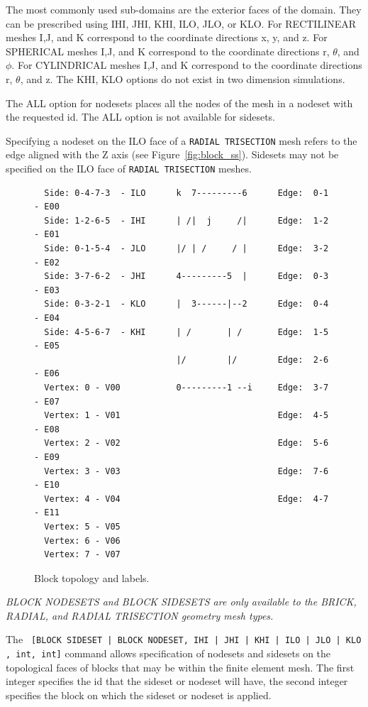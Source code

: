 The most commonly used sub-domains are the exterior faces of the
domain. They can be prescribed using \textsc {IHI, JHI, KHI, ILO,
JLO,} or \textsc {KLO}. For RECTILINEAR meshes \textsc {I,J,} and
\textsc {K} correspond to the coordinate directions x, y, and z. For
SPHERICAL meshes \textsc {I,J,} and \textsc {K} correspond to the
coordinate directions r, $\theta$, and $\phi$. For CYLINDRICAL meshes \textsc
{I,J,} and \textsc {K} correspond to the coordinate directions r,
$\theta$, and z.  The \textsc {KHI, KLO} options do not exist in two
dimension simulations.

The \textsc{ALL} option for nodesets places all the nodes of the mesh in a 
nodeset with the requested id. The \textsc{ALL} option is not available for 
sidesets.

Specifying a nodeset on the \textsc{ILO} face of a \texttt{RADIAL TRISECTION} mesh 
refers to the edge aligned with the Z axis (see Figure~\ref{fig:block_ss}). 
Sidesets may not be  specified on the \textsc{ILO} face of 
\texttt{RADIAL TRISECTION} meshes.

\begin{figure}[htbp]
{\ttfamily \small \begin{verbatim}
  Side: 0-4-7-3  - ILO      k  7---------6      Edge:  0-1 - E00  
  Side: 1-2-6-5  - IHI      | /|  j     /|      Edge:  1-2 - E01
  Side: 0-1-5-4  - JLO      |/ | /     / |      Edge:  3-2 - E02
  Side: 3-7-6-2  - JHI      4---------5  |      Edge:  0-3 - E03
  Side: 0-3-2-1  - KLO      |  3------|--2      Edge:  0-4 - E04
  Side: 4-5-6-7  - KHI      | /       | /       Edge:  1-5 - E05
                            |/        |/        Edge:  2-6 - E06
  Vertex: 0 - V00           0---------1 --i     Edge:  3-7 - E07
  Vertex: 1 - V01                               Edge:  4-5 - E08
  Vertex: 2 - V02                               Edge:  5-6 - E09
  Vertex: 3 - V03                               Edge:  7-6 - E10
  Vertex: 4 - V04                               Edge:  4-7 - E11
  Vertex: 5 - V05
  Vertex: 6 - V06
  Vertex: 7 - V07
\end{verbatim}
}
\caption{Block topology and labels.}
\label{fig:set_assign_topology}
\end{figure}

\emph{BLOCK NODESETS and BLOCK SIDESETS are only available to the BRICK,
RADIAL, and  RADIAL TRISECTION geometry mesh types.}

The \texttt{  [{BLOCK SIDESET | BLOCK NODESET},{ IHI | JHI | KHI | ILO | JLO |
KLO }, int, int]} command allows specification of nodesets and
sidesets on the topological faces of blocks that may be within the
finite element mesh. The first integer specifies the id that the
sideset or nodeset will have, the second integer specifies the block
on which the sideset or nodeset is applied.


